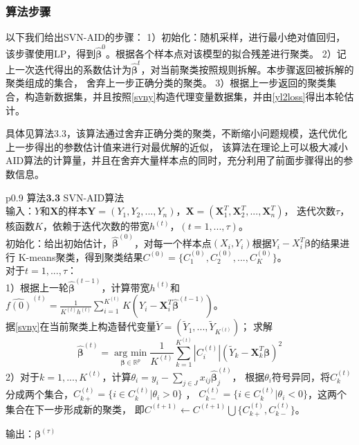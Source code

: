 \subsubsection{算法步骤}
以下我们给出SVN-AID的步骤：
1）初始化：随机采样，进行最小绝对值回归，该步骤使用LP，得到$\hat{\bm{\beta}}^0$。根据各个样本点对该模型的拟合残差进行聚类。
2）记上一次迭代得出的系数估计为$\hat{\bm{\beta}}^t$，对当前聚类按照规则拆解。本步骤返回被拆解的聚类组成的集合，
舍弃上一步正确分类的聚类。
3）根据上一步返回的聚类集合，构造新数据集，并且按照\eqref{svny}构造代理变量数据集，并由\eqref{yl2loss}得出本轮估计。

具体见算法3.3，该算法通过舍弃正确分类的聚类，不断缩小问题规模，迭代优化上一步得出的参数估计值来进行对最优解的近似，
该算法在理论上可以极大减小AID算法的计算量，并且在舍弃大量样本点的同时，充分利用了前面步骤得出的参数信息。

\begin{table}[H]%
    \centering%
    \begin{tabular}{{p{0.9\columnwidth}}}%
    \toprule%
    {\heiti 算法}{\bf 3.3} SVN-AID算法\\
    \midrule%
    输入：$Y$和$\bm{X}$的样本$\bm{Y} = (Y_1, Y_2, ..., Y_n)$，$\bm{X} = (\bm{X}^T_1, \bm{X}^T_2, ..., \bm{X}^T_n)$，
    迭代次数$\tau$，核函数$K$，依赖于迭代次数的带宽$h^{(t)}$，$(t = 1, ..., \tau)$。
    \\
    初始化：给出初始估计，$\hat{\bm{\beta}}^{(0)} $，对每一个样本点$(X_i, Y_i)$根据$Y_i - X_i^T\bm{\beta} $的结果进行
    K-means聚类，得到聚类结果$C^{(0)} = \{C_1^{(0)}, C_2^{(0)}, ... , C_K^{(0)}\}$。
    \\
    对于$t = 1, ..., \tau$：\\
        1）根据上一轮$\hat{\bm{\beta}}^{(t-1)}$，计算带宽$h^{(t)}$和
        $\hat{f(0)}^{(t)} = \frac{1}{K^{(t)}h^{(t)}}\sum_{i=1}^{K^{(t)}}K(Y_i - \bm{X}_i^T\hat{\bm{\beta}}^{(t-1)})$。\\
        据\eqref{svny}在当前聚类上构造替代变量$\tilde{Y} = (\tilde{Y}_1, ..., \tilde{Y}_{K^{(t)}})$；
        求解
        $$
            \hat{\bm{\beta}}^{(t)} = \underset{\bm{\beta} \in \mathbb{R}^{p}}{\operatorname{arg\ min}}
            \frac1{K^{(t)}} \sum_{k=1}^{K^{(t)}}|C_i^{(t)}|(\tilde{Y}_k - \bm{X}_k^T\bm{\beta})^2
        $$
        2）对于$k = 1, ..., K^{(t)}$，计算$\theta_i = y_i - \sum_{j \in J}x_{ij}\hat{\bm{\beta}}_j^{(t)}$，
        根据$\theta_i$符号异同，将$C^{(t)}_k$分成两个集合，$C_{k+}^{(t)} = \{i \in C_k^{(t)} | \theta_i > 0\}$ ，
        $C_{k-}^{(t)} = \{i \in C_k^{(t)} | \theta_i < 0\}$，这两个集合在下一步形成新的聚类，
        即$C^{(t+1)} \leftarrow C^{(t+1)}\bigcup \{ C_{k+}^{(t)}, C_{k-}^{(t)}\}$。 
        
        输出：$\bm{\beta}^{(\tau)}$
    \\
    \bottomrule%
    \end{tabular}
\end{table}%

